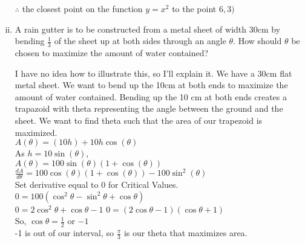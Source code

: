 \documentclass{letter}
\begin{document}
\begin{enumerate}[i) ]
	$\therefore$ the closest point on the function $y=x^2$ to the point $6, 3)$\\
	
	\item A rain gutter is to be constructed from a metal sheet of width 30cm by bending $\frac{1}{3}$ of the sheet up at both sides through an angle $\theta$. How should $\theta$ be chosen to maximize the amount of water contained?
	
	I have no idea how to illustrate this, so I'll explain it. We have a 30cm flat metal sheet. We want to bend up the 10cm at both ends to maximize the amount of water contained. Bending up the 10 cm at both ends creates a trapazoid with theta representing the angle between the ground and the sheet. We want to find theta such that the area of our trapezoid is maximized.\\
	
	$A(\theta) = (10h) + 10h\cos(\theta)$\\
	As $h = 10\sin(\theta)$, \\
	$A(\theta) = 100\sin(\theta)(1+\cos(\theta))$\\
	$\frac{dA}{d\theta} = 100\cos(\theta)(1+\cos(\theta)) - 100\sin^2(\theta)$\\
	
	Set derivative equal to 0 for Critical Values.\\
	
	$0 = 100(\cos^2\theta - \sin^2\theta + \cos\theta)$\\
	$0 = 2\cos^2\theta + \cos\theta - 1$
	$0 = (2\cos\theta - 1)(\cos\theta + 1)$\\
	
	So, $\cos\theta = \frac{1}{2}$ or $-1$\\
	-1 is out of our interval, so $\frac{\pi}{3}$ is our theta that maximizes area.
	\end{enumerate}
\end{document}
